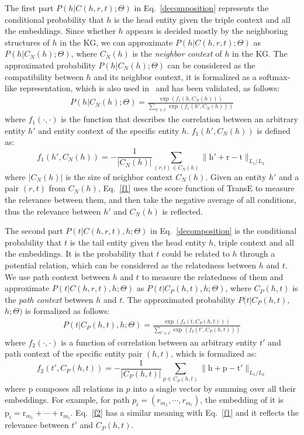 The first part $P(h|C(h,r,t);\Theta)$ in Eq.~\eqref{decomposition} represents the conditional probability that $h$ is the head entity given the triple context and all the embeddings. Since whether $h$ appears is decided mostly by the neighboring structures of $h$ in the KG, we can approximate $P(h|C(h,r,t);\Theta)$ as $P(h|C_N(h);\Theta)$, where $C_N(h)$ is the \emph{neighbor context} of $h$ in the KG. The approximated probability $P(h|C_N(h);\Theta)$ can be considered as the compatibility between $h$ and its neighbor context, it is formalized as a softmax-like representation, which is also used in~\cite{DBLP:conf/emnlp/WangZFC14} and has been validated, as follows:
\begin{align} \label{P_h}
  P(h|C_N(h);\Theta) = \frac{\exp(f_1(h, C_N(h)))}{\sum_{h' \in \mathcal{E}} \exp(f_1(h', C_N(h)))}
\end{align}
where $f_1(\cdot, \cdot)$ is the function that describes the correlation between an arbitrary entity $h'$ and entity context of the specific entity $h$. $f_1(h',C_N(h))$ is defined as:
\begin{equation}\label{f1}
  f_1(h',C_N(h)) =-\frac{1}{|C_N(h)|}\sum_{(r,t)\in C_N(h)} \|\bm{\mathrm{h'}}+ \bm{\mathrm{r}} - \bm{\mathrm{t}}\|_{L_1/L_2}
\end{equation}
where $|C_N(h)|$ is the size of neighbor context $C_N(h)$. Given an entity $h'$ and a pair $(r,t)$ from $C_N(h)$, Eq.~\eqref{f1} uses the score function of TransE to measure the relevance between them, and then take the negative average of all conditions, thus the relevance between $h'$ and $C_N(h)$ is reflected.

The second part $P(t|C(h,r,t),h;\Theta)$ in Eq.~\eqref{decomposition} is the conditional probability that $t$ is the tail entity given the head entity $h$, triple context and all the embeddings. It is the probability that $t$ could be related to $h$ through a potential relation, which can be considered as the relatedness between $h$ and $t$. We use path context between $h$ and $t$ to measure the relatedness of them and approximate $P(t|C(h,r,t),h;\Theta)$ as $P(t|C_P(h,t),h;\Theta)$, where $C_P(h,t)$ is the \emph{path context} between $h$ and $t$. The approximated probability $P(t|C_P(h,t),$ $h;\Theta)$ is formalized as follows:
\begin{align}\label{P_t}
  P(t|C_P(h,t),h;\Theta) = \frac{\exp(f_2(t,C_P(h,t)))}{\sum_{t' \in \mathcal{E}} \exp(f_2(t', C_P(h,t)))}
\end{align}
where $f_2(\cdot, \cdot)$ is a function of correlation between an arbitrary entity $t'$ and path context of the specific entity pair $(h,t)$, which is formalized as:
\begin{equation}\label{f2}
  f_2(t',C_P(h,t)) = -\frac{1}{|C_P(h,t)|}\sum_{p\in C_P(h,t)} \|\bm{\mathrm{h}} + \bm{\mathrm{p}} - \bm{\mathrm{t'}}\|_{L_1/L_2}
\end{equation}
where $\bm{\mathrm{p}}$ composes all relations in $p$ into a single vector by summing over all their embeddings. For example, for path $p_i=(r_{m_1}, \cdots, r_{m_i})$, the embedding of it is $\bm{\mathrm{p}}_i = \bm{\mathrm{r}}_{m_1} + \cdots + \bm{\mathrm{r}}_{m_i}$. Eq.~\eqref{f2} has a similar meaning with Eq.~\eqref{f1} and it reflects the relevance between $t'$ and $C_P(h,t)$.

